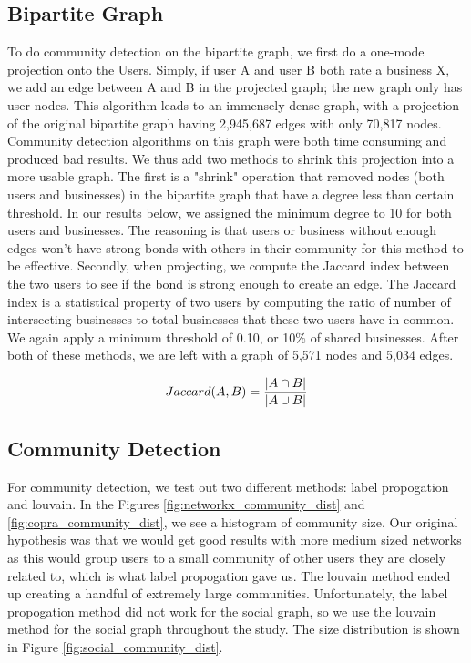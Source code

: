 \documentclass[10pt]{article}
\begin{document}
\subsection{Bipartite Graph}

To do community detection on the bipartite graph, we first do a one-mode projection onto the Users.  Simply, if user A and user B both rate a business X, we add an edge between A and B in the projected graph; the new graph only has user nodes.  This algorithm leads to an immensely dense graph, with a projection of the original bipartite graph having 2,945,687 edges with only 70,817 nodes.  Community detection algorithms on this graph were both time consuming and produced bad results.  We thus add two methods to shrink this projection into a more usable graph.  The first is a "shrink" operation that removed nodes (both users and businesses) in the bipartite graph that have a degree less than certain threshold.  In our results below, we assigned the minimum degree to 10 for both users and businesses.  The reasoning is that users or business without enough edges won't have strong bonds with others in their community for this method to be effective. Secondly, when projecting, we compute the Jaccard index between the two users to see if the bond is strong enough to create an edge.  The Jaccard index is a statistical property of two users by computing the ratio of number of intersecting businesses to total businesses that these two users have in common.  We again apply a minimum threshold of 0.10, or 10\% of shared businesses.  After both of these methods, we are left with a graph of 5,571 nodes and 5,034 edges.

\begin{equation}
Jaccard(A,B) = {{|A \cap B|}\over{|A \cup B|}}
\end{equation}

\subsection{Community Detection}

For community detection, we test out two different methods: label propogation\cite{gregory2010finding} and louvain\cite{blondel2008fast}.  In the Figures \ref{fig:networkx_community_dist} and \ref{fig:copra_community_dist}, we see a histogram of community size.  Our original hypothesis was that we would get good results with more medium sized networks as this would group users to a small community of other users they are closely related to, which is what label propogation gave us.  The louvain method ended up creating a handful of extremely large communities.  Unfortunately, the label propogation method did not work for the social graph, so we use the louvain method for the social graph throughout the study.  The size distribution is shown in Figure \ref{fig:social_community_dist}.
\end{document}
